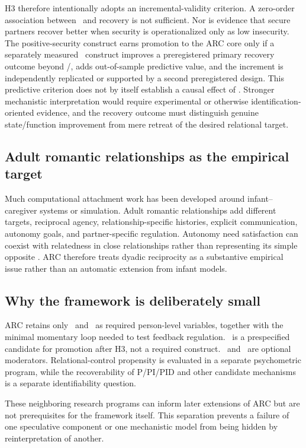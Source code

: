 H3 therefore intentionally adopts an incremental-validity criterion. A zero-order association between \Sec\ and recovery is not sufficient. Nor is evidence that secure partners recover better when security is operationalized only as low insecurity. The positive-security construct earns promotion to the ARC core only if a separately measured \Sec\ construct improves a preregistered primary recovery outcome beyond \Anx/\Avo, adds out-of-sample predictive value, and the increment is independently replicated or supported by a second preregistered design. This predictive criterion does not by itself establish a causal effect of \Sec. Stronger mechanistic interpretation would require experimental or otherwise identification-oriented evidence, and the recovery outcome must distinguish genuine state/function improvement from mere retreat of the desired relational target.

\subsection{Adult romantic relationships as the empirical target}

Much computational attachment work has been developed around infant--caregiver systems or simulation. Adult romantic relationships add different targets, reciprocal agency, relationship-specific histories, explicit communication, autonomy goals, and partner-specific regulation. Autonomy need satisfaction can coexist with relatedness in close relationships rather than representing its simple opposite \parencite{kluwer2020autonomy}. ARC therefore treats dyadic reciprocity as a substantive empirical issue rather than an automatic extension from infant models.

\subsection{Why the framework is deliberately small}

ARC retains only \Anx\ and \Avo\ as required person-level variables, together with the minimal momentary loop needed to test feedback regulation. \Sec\ is a prespecified candidate for promotion after H3, not a required construct. \MentAff\ and \Flex\ are optional moderators. Relational-control propensity is evaluated in a separate psychometric program, while the recoverability of P/PI/PID and other candidate mechanisms is a separate identifiability question.

These neighboring research programs can inform later extensions of ARC but are not prerequisites for the framework itself. This separation prevents a failure of one speculative component or one mechanistic model from being hidden by reinterpretation of another.


